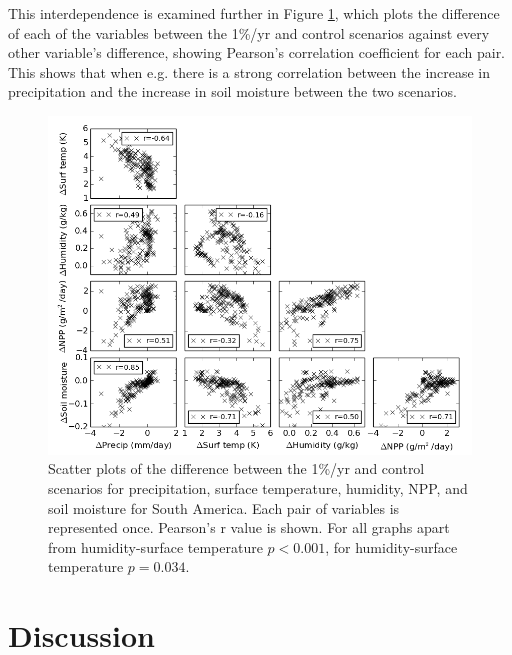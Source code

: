 \documentclass{article}
\begin{document}
\newpage

This interdependence is examined further in Figure \ref{fig:corr}, which plots the difference of each of the variables between the 1\%/yr and control scenarios against every other variable's difference, showing Pearson's correlation coefficient for each pair. This shows that when e.g. there is a strong correlation between the increase in precipitation and the increase in soil moisture between the two scenarios. 

\begin{figure}[hbp]
    \centering
    \includegraphics[width=\textwidth]{figures/corr}
    \caption{Scatter plots of the difference between the 1\%/yr and control scenarios for precipitation, surface temperature, humidity, NPP, and soil moisture for South America. Each pair of variables is represented once. Pearson's r value is shown. For all graphs apart from humidity-surface temperature $p < 0.001$, for humidity-surface temperature $p = 0.034$. }
    \label{fig:corr}
\end{figure}

\newpage

\section{Discussion}
\end{document}
